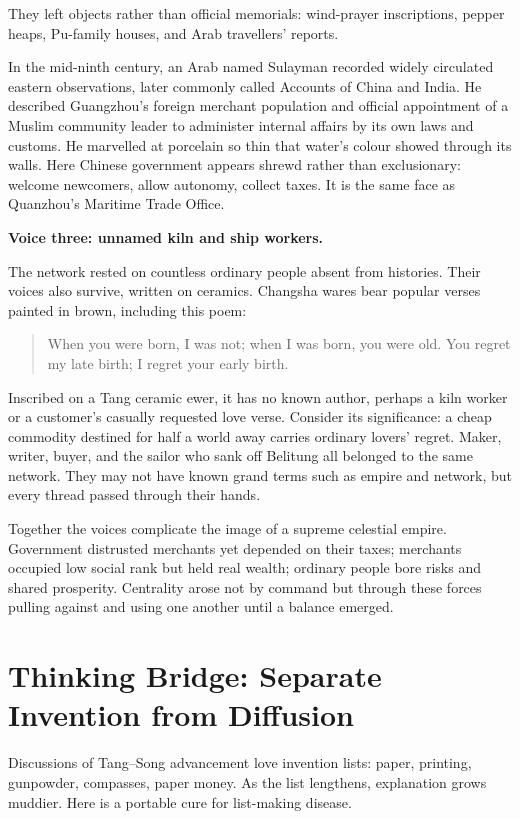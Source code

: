 They left objects rather than official memorials: wind-prayer inscriptions, pepper heaps, Pu-family houses, and Arab travellers' reports.

In the mid-ninth century, an Arab named Sulayman recorded widely circulated eastern observations, later commonly called Accounts of China and India. He described Guangzhou's foreign merchant population and official appointment of a Muslim community leader to administer internal affairs by its own laws and customs. He marvelled at porcelain so thin that water's colour showed through its walls. Here Chinese government appears shrewd rather than exclusionary: welcome newcomers, allow autonomy, collect taxes. It is the same face as Quanzhou's Maritime Trade Office.

\textbf{Voice three: unnamed kiln and ship workers.}

The network rested on countless ordinary people absent from histories. Their voices also survive, written on ceramics. Changsha wares bear popular verses painted in brown, including this poem:

\begin{quote}
When you were born, I was not; when I was born, you were old. You regret my late birth; I regret your early birth.
\end{quote}
Inscribed on a Tang ceramic ewer, it has no known author, perhaps a kiln worker or a customer's casually requested love verse. Consider its significance: a cheap commodity destined for half a world away carries ordinary lovers' regret. Maker, writer, buyer, and the sailor who sank off Belitung all belonged to the same network. They may not have known grand terms such as empire and network, but every thread passed through their hands.

Together the voices complicate the image of a supreme celestial empire. Government distrusted merchants yet depended on their taxes; merchants occupied low social rank but held real wealth; ordinary people bore risks and shared prosperity. Centrality arose not by command but through these forces pulling against and using one another until a balance emerged.

\section[Thinking Bridge: Invention and Diffusion]{Thinking Bridge: Separate Invention from Diffusion}
Discussions of Tang--Song advancement love invention lists: paper, printing, gunpowder, compasses, paper money. As the list lengthens, explanation grows muddier. Here is a portable cure for list-making disease.

